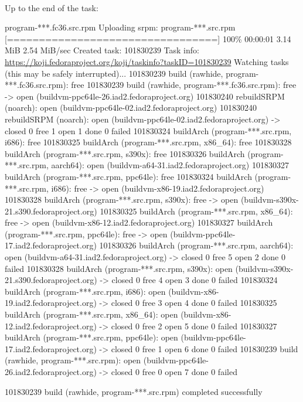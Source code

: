 \\
\noindent Up to the end of the task:
{\scriptsize{
\begin{script}
\fprompt{~}    program-***.fc36.src.rpm
Uploading srpm:  program-***.src.rpm
[=================================] 100\% 00:00:01   3.14 MiB   2.54 MiB/sec
Created task: 101830239
Task info: \href{https://koji.fedoraproject.org/koji/taskinfo?taskID=101830239}{https://koji.fedoraproject.org/koji/taskinfo?taskID=101830239}
Watching tasks (this may be safely interrupted)...
101830239 build (rawhide, program-***.fc36.src.rpm): free
101830239 build (rawhide, program-***.fc36.src.rpm): free -> open (buildvm-ppc64le-26.iad2.fedoraproject.org)
  101830240 rebuildSRPM (noarch): open (buildvm-ppc64le-02.iad2.fedoraproject.org)
  101830240 rebuildSRPM (noarch): open (buildvm-ppc64le-02.iad2.fedoraproject.org) -> closed
  0 free  1 open  1 done  0 failed
  101830324 buildArch (program-***.src.rpm, i686): free
  101830325 buildArch (program-***.src.rpm, x86\_64): free
  101830328 buildArch (program-***.src.rpm, s390x): free
  101830326 buildArch (program-***.src.rpm, aarch64): open (buildvm-a64-31.iad2.fedoraproject.org)
  101830327 buildArch (program-***.src.rpm, ppc64le): free
  101830324 buildArch (program-***.src.rpm, i686): free -> open (buildvm-x86-19.iad2.fedoraproject.org)
  101830328 buildArch (program-***.src.rpm, s390x): free -> open (buildvm-s390x-21.s390.fedoraproject.org)
  101830325 buildArch (program-***.src.rpm, x86\_64): free -> open (buildvm-x86-12.iad2.fedoraproject.org)
  101830327 buildArch (program-***.src.rpm, ppc64le): free -> open (buildvm-ppc64le-17.iad2.fedoraproject.org)
  101830326 buildArch (program-***.src.rpm, aarch64): open (buildvm-a64-31.iad2.fedoraproject.org) -> closed
  0 free  5 open  2 done  0 failed
  101830328 buildArch (program-***.src.rpm, s390x): open (buildvm-s390x-21.s390.fedoraproject.org) -> closed
  0 free  4 open  3 done  0 failed
  101830324 buildArch (program-***.src.rpm, i686): open (buildvm-x86-19.iad2.fedoraproject.org) -> closed
  0 free  3 open  4 done  0 failed
  101830325 buildArch (program-***.src.rpm, x86\_64): open (buildvm-x86-12.iad2.fedoraproject.org) -> closed
  0 free  2 open  5 done  0 failed
  101830327 buildArch (program-***.src.rpm, ppc64le): open (buildvm-ppc64le-17.iad2.fedoraproject.org) -> closed
  0 free  1 open  6 done  0 failed
101830239 build (rawhide, program-***.src.rpm): open (buildvm-ppc64le-26.iad2.fedoraproject.org) -> closed
  0 free  0 open  7 done  0 failed

101830239 build (rawhide, program-***.src.rpm) completed successfully
\end{script}
}}

